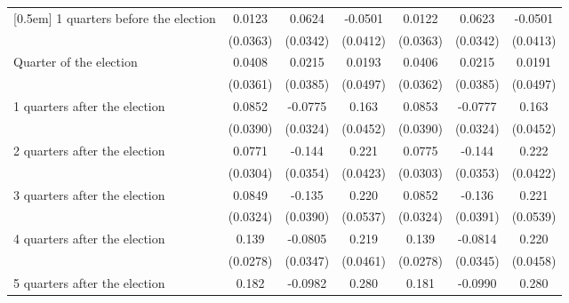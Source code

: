 \begin{table}[!ht]
\begin{tabular}{l*{6}{c}}
[0.5em]
 1 quarters before the election&      0.0123         &      0.0624         &     -0.0501         &      0.0122         &      0.0623         &     -0.0501         \\
                    &    (0.0363)         &    (0.0342)         &    (0.0412)         &    (0.0363)         &    (0.0342)         &    (0.0413)         \\
[0.5em]
Quarter of the election&      0.0408         &      0.0215         &      0.0193         &      0.0406         &      0.0215         &      0.0191         \\
                    &    (0.0361)         &    (0.0385)         &    (0.0497)         &    (0.0362)         &    (0.0385)         &    (0.0497)         \\
[0.5em]
 1 quarters after the election&      0.0852\sym{*}  &     -0.0775\sym{*}  &       0.163\sym{***}&      0.0853\sym{*}  &     -0.0777\sym{*}  &       0.163\sym{***}\\
                    &    (0.0390)         &    (0.0324)         &    (0.0452)         &    (0.0390)         &    (0.0324)         &    (0.0452)         \\
[0.5em]
 2 quarters after the election&      0.0771\sym{*}  &      -0.144\sym{***}&       0.221\sym{***}&      0.0775\sym{*}  &      -0.144\sym{***}&       0.222\sym{***}\\
                    &    (0.0304)         &    (0.0354)         &    (0.0423)         &    (0.0303)         &    (0.0353)         &    (0.0422)         \\
[0.5em]
 3 quarters after the election&      0.0849\sym{**} &      -0.135\sym{***}&       0.220\sym{***}&      0.0852\sym{**} &      -0.136\sym{***}&       0.221\sym{***}\\
                    &    (0.0324)         &    (0.0390)         &    (0.0537)         &    (0.0324)         &    (0.0391)         &    (0.0539)         \\
[0.5em]
 4 quarters after the election&       0.139\sym{***}&     -0.0805\sym{*}  &       0.219\sym{***}&       0.139\sym{***}&     -0.0814\sym{*}  &       0.220\sym{***}\\
                    &    (0.0278)         &    (0.0347)         &    (0.0461)         &    (0.0278)         &    (0.0345)         &    (0.0458)         \\
[0.5em]
 5 quarters after the election&       0.182\sym{***}&     -0.0982\sym{**} &       0.280\sym{***}&       0.181\sym{***}&     -0.0990\sym{**} &       0.280\sym{***}\\

\end{tabular}
\end{table}
